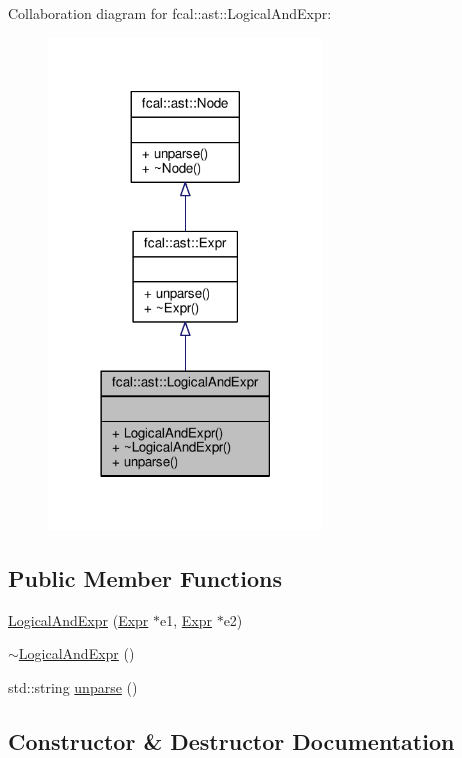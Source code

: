 Collaboration diagram for fcal\+:\+:ast\+:\+:Logical\+And\+Expr\+:
\nopagebreak
\begin{figure}[H]
\begin{center}
\leavevmode
\includegraphics[width=206pt]{classfcal_1_1ast_1_1LogicalAndExpr__coll__graph}
\end{center}
\end{figure}
\subsection*{Public Member Functions}
\begin{DoxyCompactItemize}
\item 
\hyperlink{classfcal_1_1ast_1_1LogicalAndExpr_abc61e0f4df2faba0e900dbd42c642d9d}{Logical\+And\+Expr} (\hyperlink{classfcal_1_1ast_1_1Expr}{Expr} $\ast$e1, \hyperlink{classfcal_1_1ast_1_1Expr}{Expr} $\ast$e2)
\item 
\hyperlink{classfcal_1_1ast_1_1LogicalAndExpr_aa5a16b3f9bcf28b853d8baf77d5a12ba}{$\sim$\+Logical\+And\+Expr} ()
\item 
std\+::string \hyperlink{classfcal_1_1ast_1_1LogicalAndExpr_ade9698171dd31ad7253f7e2a96a72a04}{unparse} ()
\end{DoxyCompactItemize}


\subsection{Constructor \& Destructor Documentation}
